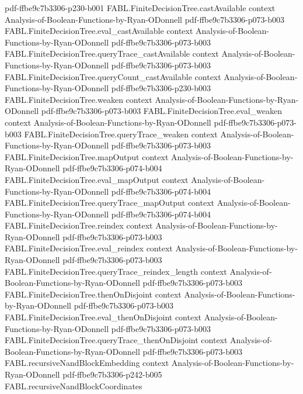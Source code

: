 \begin{theorem}
  {pdf-ffbe9c7b3306-p230-b001}
\proofstep
  {FABL.FiniteDecisionTree.castAvailable}
  {context}
  {Analysis-of-Boolean-Functions-by-Ryan-ODonnell}
  {pdf-ffbe9c7b3306-p073-b003}
\proofstep
  {FABL.FiniteDecisionTree.eval_castAvailable}
  {context}
  {Analysis-of-Boolean-Functions-by-Ryan-ODonnell}
  {pdf-ffbe9c7b3306-p073-b003}
\proofstep
  {FABL.FiniteDecisionTree.queryTrace_castAvailable}
  {context}
  {Analysis-of-Boolean-Functions-by-Ryan-ODonnell}
  {pdf-ffbe9c7b3306-p073-b003}
\proofstep
  {FABL.FiniteDecisionTree.queryCount_castAvailable}
  {context}
  {Analysis-of-Boolean-Functions-by-Ryan-ODonnell}
  {pdf-ffbe9c7b3306-p230-b003}
\proofstep
  {FABL.FiniteDecisionTree.weaken}
  {context}
  {Analysis-of-Boolean-Functions-by-Ryan-ODonnell}
  {pdf-ffbe9c7b3306-p073-b003}
\proofstep
  {FABL.FiniteDecisionTree.eval_weaken}
  {context}
  {Analysis-of-Boolean-Functions-by-Ryan-ODonnell}
  {pdf-ffbe9c7b3306-p073-b003}
\proofstep
  {FABL.FiniteDecisionTree.queryTrace_weaken}
  {context}
  {Analysis-of-Boolean-Functions-by-Ryan-ODonnell}
  {pdf-ffbe9c7b3306-p073-b003}
\proofstep
  {FABL.FiniteDecisionTree.mapOutput}
  {context}
  {Analysis-of-Boolean-Functions-by-Ryan-ODonnell}
  {pdf-ffbe9c7b3306-p074-b004}
\proofstep
  {FABL.FiniteDecisionTree.eval_mapOutput}
  {context}
  {Analysis-of-Boolean-Functions-by-Ryan-ODonnell}
  {pdf-ffbe9c7b3306-p074-b004}
\proofstep
  {FABL.FiniteDecisionTree.queryTrace_mapOutput}
  {context}
  {Analysis-of-Boolean-Functions-by-Ryan-ODonnell}
  {pdf-ffbe9c7b3306-p074-b004}
\proofstep
  {FABL.FiniteDecisionTree.reindex}
  {context}
  {Analysis-of-Boolean-Functions-by-Ryan-ODonnell}
  {pdf-ffbe9c7b3306-p073-b003}
\proofstep
  {FABL.FiniteDecisionTree.eval_reindex}
  {context}
  {Analysis-of-Boolean-Functions-by-Ryan-ODonnell}
  {pdf-ffbe9c7b3306-p073-b003}
\proofstep
  {FABL.FiniteDecisionTree.queryTrace_reindex_length}
  {context}
  {Analysis-of-Boolean-Functions-by-Ryan-ODonnell}
  {pdf-ffbe9c7b3306-p073-b003}
\proofstep
  {FABL.FiniteDecisionTree.thenOnDisjoint}
  {context}
  {Analysis-of-Boolean-Functions-by-Ryan-ODonnell}
  {pdf-ffbe9c7b3306-p073-b003}
\proofstep
  {FABL.FiniteDecisionTree.eval_thenOnDisjoint}
  {context}
  {Analysis-of-Boolean-Functions-by-Ryan-ODonnell}
  {pdf-ffbe9c7b3306-p073-b003}
\proofstep
  {FABL.FiniteDecisionTree.queryTrace_thenOnDisjoint}
  {context}
  {Analysis-of-Boolean-Functions-by-Ryan-ODonnell}
  {pdf-ffbe9c7b3306-p073-b003}
\proofstep
  {FABL.recursiveNandBlockEmbedding}
  {context}
  {Analysis-of-Boolean-Functions-by-Ryan-ODonnell}
  {pdf-ffbe9c7b3306-p242-b005}
\proofstep
  {FABL.recursiveNandBlockCoordinates}

\end{theorem}
